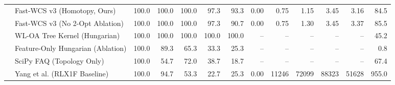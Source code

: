 \begin{table}[!t]
\begin{tabular*}{\textwidth}{@{\extracolsep{\fill}}llrrrrrrrrrrr@{}}
 & Fast-WCS v3 (Homotopy, Ours) & 100.0 & 100.0 & 100.0 & 97.3 & 93.3 & 0.00 & 0.75 & 1.15 & 3.45 & 3.16 & 84.5 \\
 & Fast-WCS v3 (No 2-Opt Ablation) & 100.0 & 100.0 & 100.0 & 97.3 & 90.7 & 0.00 & 0.75 & 1.30 & 3.45 & 3.37 & 85.5 \\
 & WL-OA Tree Kernel (Hungarian)~\cite{shervashidze2011weisfeiler} & 100.0 & 100.0 & 100.0 & 100.0 & 100.0 & -- & -- & -- & -- & -- & 45.2 \\
 & Feature-Only Hungarian (Ablation) & 100.0 & 89.3 & 65.3 & 33.3 & 25.3 & -- & -- & -- & -- & -- & 0.8 \\
 & SciPy FAQ (Topology Only)~\cite{vogelstein2015fast} & 100.0 & 54.7 & 72.0 & 38.7 & 18.7 & -- & -- & -- & -- & -- & 67.4 \\
 & Yang et al. (RLX1F Baseline)~\cite{yang2018algorithm} & 100.0 & 94.7 & 53.3 & 22.7 & 25.3 & 0.00 & 11246 & 72099 & 88323 & 51628 & 955.0 \\
\midrule
\bottomrule
\end{tabular*}
\end{table}